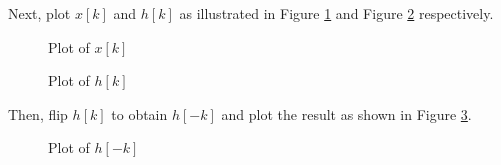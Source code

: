 \documentclass[fleqn]{article}
\begin{document}
\begin{enumerate}
		Next, plot $x[k]$ and $h[k]$ as illustrated in Figure \ref{prob1_xk_plot} and Figure \ref{prob1_hk_plot} respectively. 
		
		\begin{figure}[H]				
			\centerline{}
			\caption{Plot of $x[k]$}
			\label{prob1_xk_plot}
		\end{figure}
		
		\begin{figure}[H]				
			\centerline{}
			\caption{Plot of $h[k]$}
			\label{prob1_hk_plot}
		\end{figure}
		
		Then, flip $h[k]$ to obtain $h[-k]$ and plot the result as shown in Figure \ref{prob1_h-k_plot}.
		
		\begin{figure}[H]				
			\centerline{}
			\caption{Plot of $h[-k]$}
			\label{prob1_h-k_plot}
		\end{figure}
		

\end{enumerate}
\end{document}
